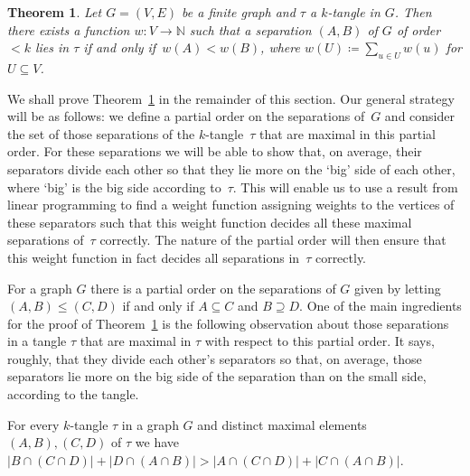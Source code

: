 \documentclass[11pt]{article}
\newtheorem{THM}{Theorem}
\theoremstyle{definition}
\newcommand{\N}{\mathbb{N}}
\newcommand{\sub}{\subseteq}
\newcommand{\abs}[1]{\left |#1\right |}
\begin{document}
\begin{THM}\label{thm:tangledecider}
	Let $ G=(V,E) $ be a finite graph and $ \tau $ a $ k $-tangle in $ G $. Then there exists a function $ w\colon V\to\N $ such that a separation $ (A,B) $ of $ G $ of order $ <k $ lies in $ \tau $ if and only if~$ w(A)<w(B) $, where $ w(U)\coloneqq\sum_{u\in U}w(u) $ for $ U\sub V $.
\end{THM}

We shall prove Theorem~\ref{thm:tangledecider} in the remainder of this section. Our general strategy will be as follows: we define a partial order on the separations of~$ G $ and consider the set of those separations of the $ k $-tangle~$ \tau $ that are maximal in this partial order. For these separations we will be able to show that, on average, their separators divide each other so that they lie more on the `big' side of each other, where `big' is the big side according to~$ \tau $. This will enable us to use a result from linear programming to find a weight function assigning weights to the vertices of these separators such that this weight function decides all these maximal separations of~$ \tau $ correctly. The nature of the partial order will then ensure that this weight function in fact decides all separations in~$ \tau $ correctly.

For a graph $ G $ there is a partial order on the separations of $ G $ given by letting $ {(A,B)\le(C,D)} $ if and only if $ A\sub C $ and $ B\supseteq D $. One of the main ingredients for the proof of Theorem~\ref{thm:tangledecider} is the following observation about those separations in a tangle $ \tau $ that are maximal in $ \tau $ with respect to this partial order.
It says, roughly, that they divide each other's separators so that, on average, those separators lie more on the big side of the separation than on the small side, according to the tangle.

\begin{LEM}\label{lem:cross-counting}
	For every $ k $-tangle $ \tau $ in a graph $ G $ and distinct maximal elements $ (A,B),(C,D) $ of $ \tau $ we have
	$ \abs{B\cap(C\cap D)}+\abs{D\cap(A\cap B)}>\abs{A\cap(C\cap D)}+\abs{C\cap(A\cap B)}$.
\end{LEM}
\end{document}

